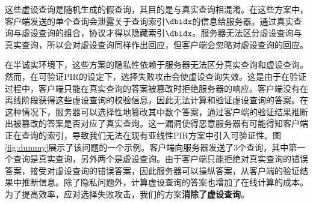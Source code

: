 这些虚设查询是随机生成的假查询，其目的是与真实查询相混淆。在这些方案中，客户端发送的单个查询会泄露关于查询索引$\dbidx$的信息给服务器。通过真实查询与虚设查询的组合，协议才得以隐藏索引$\dbidx$。服务器无法区分虚设查询与真实查询，所以会对虚设查询同样作出回应，但客户端会忽略对虚设查询的回应。

在半诚实环境下，这些方案的隐私性依赖于服务器无法区分真实查询和虚设查询。然而，在可验证PIR的设定下，选择失败攻击会使虚设查询失效。这是由于在验证过程中，客户端只能在真实查询的答案被篡改时拒绝服务器的响应。客户端没有在离线阶段获得这些虚设查询的校验信息，因此无法计算和验证虚设查询的答案。在这种情况下，服务器可以选择性地篡改其中数个答案，通过客户端的验证结果推断出被篡改的答案是否对应了真实查询。这一漏洞使得恶意服务器有可能得知客户端正在查询的索引，导致我们无法在现有亚线性PIR方案中引入可验证性。图\ref{fig:dummy}展示了该问题的一个示例。客户端向服务器发送了3个查询，其中第一个查询是真实查询，另外两个是虚设查询。由于客户端只能拒绝对真实查询的错误答案，接受对虚设查询的错误答案，因此服务器可以操纵答案，从客户端的验证结果中推断信息。除了隐私问题外，计算虚设查询的答案也增加了在线计算的成本。为了提高效率，应对选择失败攻击，我们的方案\textbf{消除了虚设查询}。

